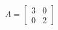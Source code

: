 \documentclass[preview]{standalone}
\begin{document}
\begin{align*}
A = \begin{bmatrix} 3 & 0 \\ 0 & 2 \end{bmatrix}
\end{align*}
\end{document}
